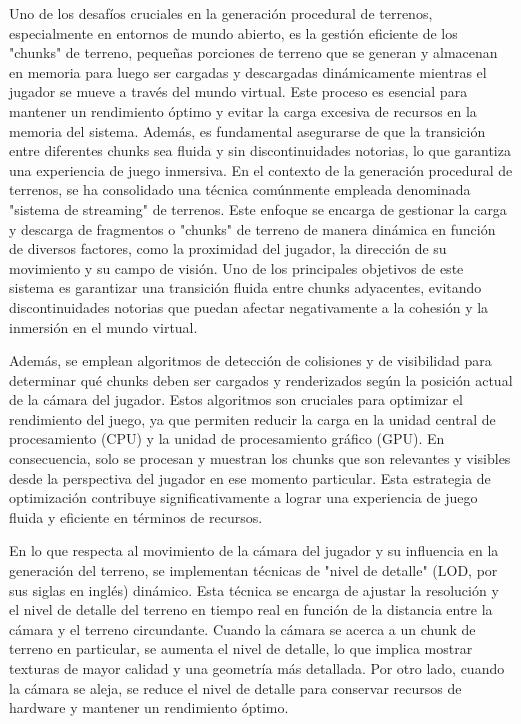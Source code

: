 Uno de los desafíos cruciales en la generación procedural de terrenos, especialmente en entornos de mundo abierto, es la gestión eficiente de los "chunks" de terreno, pequeñas porciones de terreno que se generan y almacenan en memoria para luego ser cargadas y descargadas dinámicamente mientras el jugador se mueve a través del mundo virtual. Este proceso es esencial para mantener un rendimiento óptimo y evitar la carga excesiva de recursos en la memoria del sistema. Además, es fundamental asegurarse de que la transición entre diferentes chunks sea fluida y sin discontinuidades notorias, lo que garantiza una experiencia de juego inmersiva. En el contexto de la generación procedural de terrenos, se ha consolidado una técnica comúnmente empleada denominada "sistema de streaming" de terrenos. Este enfoque se encarga de gestionar la carga y descarga de fragmentos o "chunks" de terreno de manera dinámica en función de diversos factores, como la proximidad del jugador, la dirección de su movimiento y su campo de visión. Uno de los principales objetivos de este sistema es garantizar una transición fluida entre chunks adyacentes, evitando discontinuidades notorias que puedan afectar negativamente a la cohesión y la inmersión en el mundo virtual.

Además, se emplean algoritmos de detección de colisiones y de visibilidad para determinar qué chunks deben ser cargados y renderizados según la posición actual de la cámara del jugador. Estos algoritmos son cruciales para optimizar el rendimiento del juego, ya que permiten reducir la carga en la unidad central de procesamiento (CPU) y la unidad de procesamiento gráfico (GPU). En consecuencia, solo se procesan y muestran los chunks que son relevantes y visibles desde la perspectiva del jugador en ese momento particular. Esta estrategia de optimización contribuye significativamente a lograr una experiencia de juego fluida y eficiente en términos de recursos.

En lo que respecta al movimiento de la cámara del jugador y su influencia en la generación del terreno, se implementan técnicas de "nivel de detalle" (LOD, por sus siglas en inglés) dinámico. Esta técnica se encarga de ajustar la resolución y el nivel de detalle del terreno en tiempo real en función de la distancia entre la cámara y el terreno circundante. Cuando la cámara se acerca a un chunk de terreno en particular, se aumenta el nivel de detalle, lo que implica mostrar texturas de mayor calidad y una geometría más detallada. Por otro lado, cuando la cámara se aleja, se reduce el nivel de detalle para conservar recursos de hardware y mantener un rendimiento óptimo.

